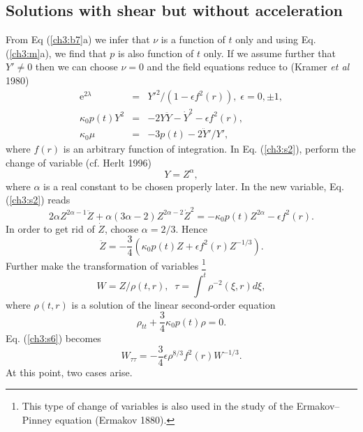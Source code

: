 {\subsection{Solutions with shear but without acceleration} 
From Eq (\ref{ch3:b7}a) we infer that $\nu$ is a function of  $t$ only and using Eq.
(\ref{ch3:m}a), we find that $p$ is also function of $t$ only. If we assume
further that $Y'\ne 0 $ then we can choose $\nu=0$ and the field equations
reduce  to (Kramer {\em et al} 1980)
\begin{eqnarray} \mbox{e}^{2\lambda} &=&
Y'^2/(1-\epsilon f^2(r)),\; \epsilon=0,\pm 1, \label{ch3:s1}\\ \kappa_0 p(t) Y^2
&=& -2Y\ddot Y-\dot Y^2-\epsilon f^2(r), \label{ch3:s2}\\ \kappa_0\mu &=&
-3p(t)-2\ddot Y'/Y', \label{ch3:s3} \end{eqnarray} where $f(r)$ is an
arbitrary function of integration. In Eq. (\ref{ch3:s2}), perform the change
of variable (cf. Herlt 1996)
\begin{equation} Y=Z^{\alpha} , \label{ch3:s4} \end{equation}
where $\alpha$ is a real constant to be chosen properly later. In the new
variable, Eq. (\ref{ch3:s2}) reads \begin{equation} 2\alpha Z^{2\alpha
-1}\ddot Z+\alpha (3\alpha-2)Z^{2\alpha-2}\dot Z^2
=-\kappa_0p(t)Z^{2\alpha}-\epsilon f^2(r). \label{ch3:s5} \end{equation} In
order to get rid of $\dot Z$, choose $\alpha=2/3$. Hence \begin{equation}
\ddot Z=-\frac{3}{4}\left (\kappa_0p(t)Z+\epsilon f^2(r)Z^{-1/3} \right ).
\label{ch3:s6} \end{equation} Further make the transformation of variables
\footnote{This type
of change of variables is also used in the study of the Ermakov--Pinney
equation (Ermakov 1880).} \begin{equation} W=Z/\rho (t,r),\;\; \tau=\int^t \rho
^{-2}(\xi,r)d\xi, \label{ch3:s7} \end{equation} where $\rho (t,r)$ is a solution
of the linear second-order equation \begin{equation}  \rho_{tt} +\frac{3}{4}\kappa_0 p(t)\rho
=0. \label{ch3:s8} \end{equation} Eq. (\ref{ch3:s6}) becomes
\begin{equation}
W_{\tau\tau} =-\frac{3}{4}\epsilon \rho^{8/3}f^2(r) W^{-1/3}. \label{ch3:s9}
\end{equation}
At this point, two cases arise.

}
